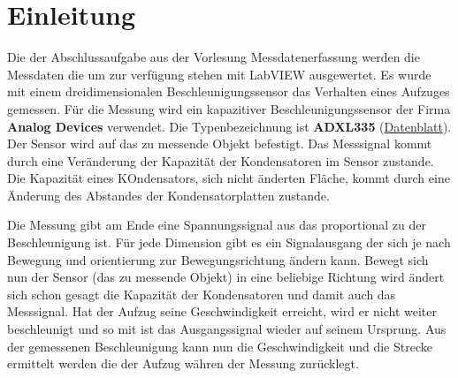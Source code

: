 \chapter{Einleitung}
    Die der Abschlussaufgabe aus der Vorlesung Messdatenerfassung werden die Messdaten die um zur verfügung stehen mit LabVIEW ausgewertet. 
    Es wurde mit einem dreidimensionalen Beschleunigungssensor das Verhalten eines Aufzuges gemessen. Für die Messung wird ein kapazitiver Beschleunigungssensor der Firma \textbf{Analog Devices} verwendet.
    Die Typenbezeichnung ist \textbf{ADXL335} (\href{http://www.analog.com/media/en/technical-documentation/data-sheets/ADXL335.pdf}{Datenblatt}). Der Sensor wird auf das zu messende Objekt befestigt. 
    Das Messsignal kommt durch eine Veränderung der Kapazität der Kondensatoren im Sensor zustande. Die Kapazität eines KOndensators, sich nicht änderten Fläche, kommt durch eine Änderung des Abstandes der Kondensatorplatten zustande.
     \par
    Die Messung gibt am Ende eine Spannungssignal aus das proportional zu der Beschleunigung ist. Für jede Dimension gibt es ein Signalausgang der sich je nach Bewegung und orientierung zur Bewegungsrichtung ändern kann. 
    Bewegt sich nun der Sensor (das zu messende Objekt) in eine beliebige Richtung wird ändert sich schon gesagt die Kapazität der Kondensatoren und damit auch das Messsignal. Hat der Aufzug seine Geschwindigkeit erreicht, wird er nicht weiter beschleunigt und so mit ist das Ausgangssignal wieder auf seinem Ursprung.
    Aus der gemessenen Beschleunigung kann nun die Geschwindigkeit und die Strecke ermittelt werden die der Aufzug währen der Messung zurücklegt. 